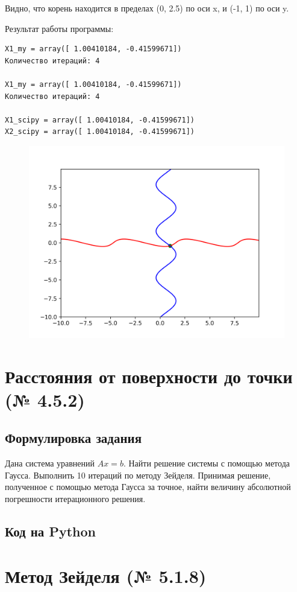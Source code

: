 \documentclass[a4paper,11pt]{article}
\theoremstyle{definition} %
\theoremstyle{remark} %
\begin{document}
Видно, что корень находится в пределах (0, 2.5) по оси x, и (-1, 1)  по оси y.

Результат работы программы:

\begin{verbatim}
X1_my = array([ 1.00410184, -0.41599671])
Количество итераций: 4

X1_my = array([ 1.00410184, -0.41599671])
Количество итераций: 4

X1_scipy = array([ 1.00410184, -0.41599671])
X2_scipy = array([ 1.00410184, -0.41599671])
\end{verbatim}

\begin{figure}[h]
    \includegraphics[width=0.49\linewidth]{../nonlinear_newton_with_point}
\end{figure}


\section{Расстояния от поверхности до точки (№ 4.5.2)}

\subsection{Формулировка задания}

Дана система уравнений $A x = b$. Найти решение системы с помощью метода Гаусса. Выполнить 10 итераций по методу Зейделя. Принимая решение, полученное с помощью метода Гаусса за точное, найти величину абсолютной погрешности итерационного решения.

\subsection{Код на Python}

\section{Метод Зейделя (№ 5.1.8)}
\end{document}
